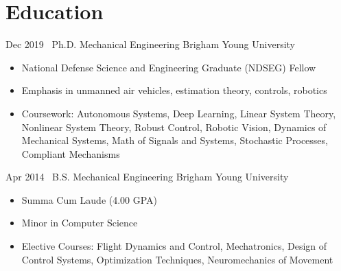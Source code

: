 \section{Education}

\begin{entrylist}
\entry
{Dec 2019}
{~Ph.D. Mechanical Engineering}
{Brigham Young University}
{%
\vspace{-1em}
\begin{itemize}
    \item National Defense Science and Engineering Graduate (NDSEG) Fellow
    \item Emphasis in unmanned air vehicles, estimation theory, controls, robotics
    \item Coursework: Autonomous Systems, Deep Learning, Linear System Theory, Nonlinear System Theory, Robust Control, Robotic Vision, Dynamics of Mechanical Systems, Math of Signals and Systems, Stochastic Processes, Compliant Mechanisms
\end{itemize}
}

\entry
{Apr 2014}
{~B.S. Mechanical Engineering}
{Brigham Young University}
{%
\vspace{-1em}
\begin{itemize}
    \item Summa Cum Laude (4.00 GPA)
    \item Minor in Computer Science
    \item Elective Courses: Flight Dynamics and Control, Mechatronics, Design of Control Systems, Optimization Techniques, Neuromechanics of Movement
\end{itemize}
}
\end{entrylist}